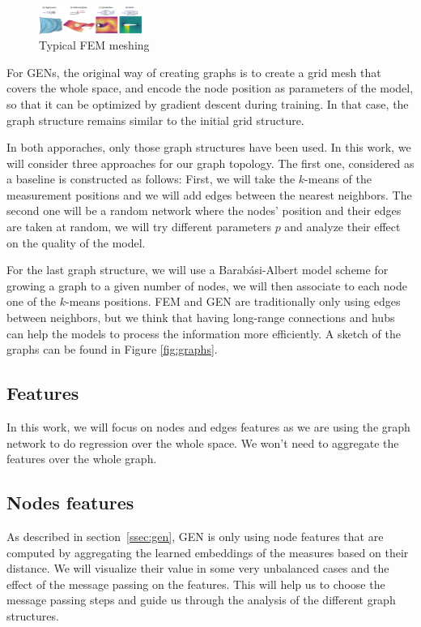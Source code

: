 \documentclass[a4paper,10pt]{article}
\begin{document}
\begin{figure}
  \centering
  \includegraphics[trim={780 0 300 50},clip,width=0.3\textwidth]{figs/mesh-dataset}
  \caption{Typical FEM meshing \cite{pfaff2020learning}}
\end{figure}

For GENs, the original way of creating graphs is to create a grid mesh that covers the whole space, and encode the node position as parameters of the model, so that it can be optimized by gradient descent during training. In that case, the graph structure remains similar to the initial grid structure.

In both apporaches, only those graph structures have been used. In this work, we will consider three approaches for our graph topology. The first one, considered as a baseline is constructed as follows: First, we will take the $k$-means of the measurement positions and we will add edges between the nearest neighbors. The second one will be a random network where the nodes' position and their edges are taken at random, we will try different parameters $p$ and analyze their effect on the quality of the model.

For the last graph structure, we will use a Barab\'asi-Albert model scheme for growing a graph to a given number of nodes, we will then associate to each node one of the $k$-means positions. FEM and GEN are traditionally only using edges between neighbors, but we think that having long-range connections and hubs can help the models to process the information more efficiently. A sketch of the graphs can be found in Figure \ref{fig:graphs}.


\subsection{Features}

In this work, we will focus on nodes and edges features as we are using the graph network to do regression over the whole space. We won't need to aggregate the features over the whole graph.


\subsection{Nodes features}
As described in section~\ref{ssec:gen}, GEN is only using node features that are computed by aggregating the learned embeddings of the measures based on their distance. We will visualize their value in some very unbalanced cases and the effect of the message passing on the features. This will help us to choose the message passing steps and guide us through the analysis of the different graph structures.
\end{document}
